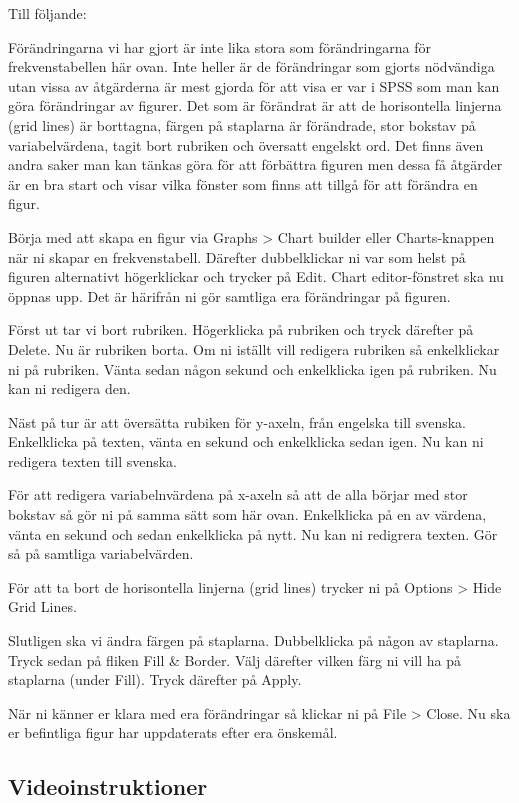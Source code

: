 \documentclass[
]{book}
\begin{document}
Till följande:

Förändringarna vi har gjort är inte lika stora som förändringarna för frekvenstabellen här ovan. Inte heller är de förändringar som gjorts nödvändiga utan vissa av åtgärderna är mest gjorda för att visa er var i SPSS som man kan göra förändringar av figurer. Det som är förändrat är att de horisontella linjerna (grid lines) är borttagna, färgen på staplarna är förändrade, stor bokstav på variabelvärdena, tagit bort rubriken och översatt engelskt ord. Det finns även andra saker man kan tänkas göra för att förbättra figuren men dessa få åtgärder är en bra start och visar vilka fönster som finns att tillgå för att förändra en figur.

Börja med att skapa en figur via Graphs \textgreater{} Chart builder eller Charts-knappen när ni skapar en frekvenstabell. Därefter dubbelklickar ni var som helst på figuren alternativt högerklickar och trycker på Edit. Chart editor-fönstret ska nu öppnas upp. Det är härifrån ni gör samtliga era förändringar på figuren.

Först ut tar vi bort rubriken. Högerklicka på rubriken och tryck därefter på Delete. Nu är rubriken borta. Om ni iställt vill redigera rubriken så enkelklickar ni på rubriken. Vänta sedan någon sekund och enkelklicka igen på rubriken. Nu kan ni redigera den.

Näst på tur är att översätta rubiken för y-axeln, från engelska till svenska. Enkelklicka på texten, vänta en sekund och enkelklicka sedan igen. Nu kan ni redigera texten till svenska.

För att redigera variabelnvärdena på x-axeln så att de alla börjar med stor bokstav så gör ni på samma sätt som här ovan. Enkelklicka på en av värdena, vänta en sekund och sedan enkelklicka på nytt. Nu kan ni redigrera texten. Gör så på samtliga variabelvärden.

För att ta bort de horisontella linjerna (grid lines) trycker ni på Options \textgreater{} Hide Grid Lines.

Slutligen ska vi ändra färgen på staplarna. Dubbelklicka på någon av staplarna. Tryck sedan på fliken Fill \& Border. Välj därefter vilken färg ni vill ha på staplarna (under Fill). Tryck därefter på Apply.

När ni känner er klara med era förändringar så klickar ni på File \textgreater{} Close. Nu ska er befintliga figur har uppdaterats efter era önskemål.

\hypertarget{videoinstruktioner-15}{%
\subsection{Videoinstruktioner}\label{videoinstruktioner-15}}
\end{document}
